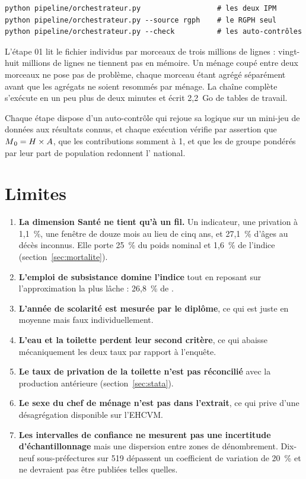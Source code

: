 \documentclass[11pt,a4paper]{article}
\begin{document}
\begin{verbatim}
python pipeline/orchestrateur.py                  # les deux IPM
python pipeline/orchestrateur.py --source rgph    # le RGPH seul
python pipeline/orchestrateur.py --check          # les auto-contrôles
\end{verbatim}

L'étape 01 lit le fichier individus par morceaux de trois millions de lignes : vingt-huit millions
de lignes ne tiennent pas en mémoire. Un ménage coupé entre deux morceaux ne pose pas de problème,
chaque morceau étant agrégé séparément avant que les agrégats ne soient resommés par ménage. La
chaîne complète s'exécute en un peu plus de deux minutes et écrit 2,2~Go de tables de travail.

Chaque étape dispose d'un auto-contrôle qui rejoue sa logique sur un mini-jeu de données aux
résultats connus, et chaque exécution vérifie par assertion que $M\textsubscript{0} = H \times A$, que les
contributions somment à 1, et que les \ipm{} de groupe pondérés par leur part de population
redonnent l'\ipm{} national.

\section{Limites}

\begin{enumerate}
  \item \textbf{La dimension Santé ne tient qu'à un fil.} Un indicateur, une privation à 1,1~\%,
        une fenêtre de douze mois au lieu de cinq ans, et 27,1~\% d'âges au décès inconnus. Elle
        porte 25~\% du poids nominal et 1,6~\% de l'indice
        (section~\ref{sec:mortalite}).
  \item \textbf{L'emploi de subsistance domine l'indice} tout en reposant sur l'approximation la
        plus lâche : 26,8~\% de \ipm{}.
  \item \textbf{L'année de scolarité est mesurée par le diplôme}, ce qui est juste en moyenne mais
        faux individuellement.
  \item \textbf{L'eau et la toilette perdent leur second critère}, ce qui abaisse mécaniquement les
        deux taux par rapport à l'enquête.
  \item \textbf{Le taux de privation de la toilette n'est pas réconcilié} avec la production
        antérieure (section~\ref{sec:stata}).
  \item \textbf{Le sexe du chef de ménage n'est pas dans l'extrait}, ce qui prive d'une
        désagrégation disponible sur l'EHCVM.
  \item \textbf{Les intervalles de confiance ne mesurent pas une incertitude d'échantillonnage}
        mais une dispersion entre zones de dénombrement. Dix-neuf sous-préfectures sur 519
        dépassent un coefficient de variation de 20~\% et ne devraient pas être publiées telles
        quelles.
\end{enumerate}
\end{document}
